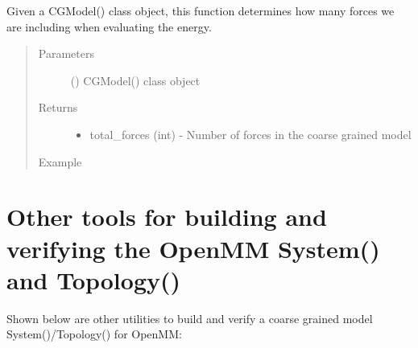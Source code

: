 \documentclass[letterpaper,12pt,english,openany,oneside]{sphinxmanual}
\begin{document}
\begin{fulllineitems}
\label{\detokenize{build:build.cg_build.get_num_forces}}
Given a CGModel() class object, this function determines how many forces we are including when evaluating the energy.
\begin{quote}\begin{description}
\item[{Parameters}] \leavevmode
{} () \textendash{} CGModel() class object

\item[{Returns}] \leavevmode
\begin{itemize}
\item {} 
total\_forces (int) - Number of forces in the coarse grained model

\end{itemize}


\item[{Example}] \leavevmode
\end{description}\end{quote}

\begin{sphinxVerbatim}[commandchars=\\\{\}]
   
  
  
\end{sphinxVerbatim}

\end{fulllineitems}


\newpage


\section{Other tools for building and verifying the OpenMM System() and Topology()}
\label{\detokenize{build:other-tools-for-building-and-verifying-the-openmm-system-and-topology}}
Shown below are other utilities to build and verify a coarse grained model System()/Topology() for OpenMM:
\end{document}

